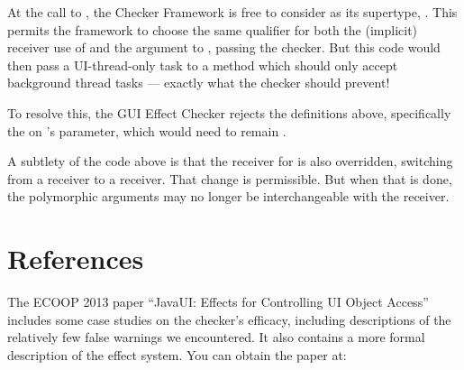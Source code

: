 At the call to , the Checker Framework is free to consider  as its
supertype, .  This permits the framework to choose the same qualifier for
both the (implicit) receiver use of  and the  argument to
, passing the checker.  But this code would then pass a UI-thread-only
task to a method which should only accept background thread tasks --- exactly what the checker
should prevent!

To resolve this, the GUI Effect Checker rejects the definitions above, specifically the
 on 's parameter, which would need to remain
.

A subtlety of the code above is that the receiver for  is also
overridden, switching from a  receiver to a  receiver.  That change is
permissible.  But when that is done, the polymorphic arguments may no longer be interchangeable
with the receiver.


\section{References\label{guieffect-references}}

The ECOOP 2013 paper ``JavaUI: Effects for Controlling UI Object Access''
    includes some case
    studies on the checker's efficacy, including descriptions of the relatively few false warnings
    we encountered.
    It also contains a more formal description of the effect system.
    You can obtain the paper at: \\


